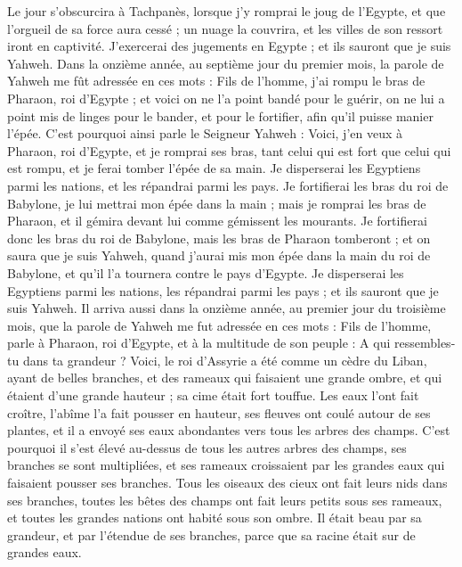 \begin{multicols}{2}
Le jour s’obscurcira à Tachpanès, lorsque j'y romprai le joug de l'Egypte, et que l'orgueil de sa force aura cessé ; un nuage la couvrira, et les villes de son ressort iront en captivité.
J'exercerai des jugements en Egypte ; et ils sauront que je suis Yahweh.
Dans la onzième année, au septième jour du premier mois, la parole de Yahweh me fût adressée en ces mots :
Fils de l’homme, j'ai rompu le bras de Pharaon, roi d'Egypte ; et voici on ne l'a point bandé pour le guérir, on ne lui a point mis de linges pour le bander, et pour le fortifier, afin qu'il puisse manier l'épée.
C'est pourquoi ainsi parle le Seigneur Yahweh : Voici, j'en veux à Pharaon, roi d'Egypte, et je romprai ses bras, tant celui qui est fort que celui qui est rompu, et je ferai tomber l'épée de sa main.
Je disperserai les Egyptiens parmi les nations, et les répandrai parmi les pays.
Je fortifierai les bras du roi de Babylone, je lui mettrai mon épée dans la main ; mais je romprai les bras de Pharaon, et il gémira devant lui comme gémissent les mourants.
Je fortifierai donc les bras du roi de Babylone, mais les bras de Pharaon tomberont ; et on saura que je suis Yahweh, quand j'aurai mis mon épée dans la main du roi de Babylone, et qu'il l’a tournera contre le pays d'Egypte.
Je disperserai les Egyptiens parmi les nations, les répandrai parmi les pays ; et ils sauront que je suis Yahweh.
\VerseOne{}Il arriva aussi dans la onzième année, au premier jour du troisième mois, que la parole de Yahweh me fut adressée en ces mots :
Fils de l’homme, parle à Pharaon, roi d'Egypte, et à la multitude de son peuple : A qui ressembles-tu dans ta grandeur ?
Voici, le roi d'Assyrie a été comme un cèdre du Liban, ayant de belles branches, et des rameaux qui faisaient une grande ombre, et qui étaient d'une grande hauteur ; sa cime était fort touffue.
Les eaux l'ont fait croître, l'abîme l'a fait pousser en hauteur, ses fleuves ont coulé autour de ses plantes, et il a envoyé ses eaux abondantes vers tous les arbres des champs.
C'est pourquoi il s’est élevé au-dessus de tous les autres arbres des champs, ses branches se sont multipliées, et ses rameaux croissaient par les grandes eaux qui faisaient pousser ses branches.
Tous les oiseaux des cieux ont fait leurs nids dans ses branches, toutes les bêtes des champs ont fait leurs petits sous ses rameaux, et toutes les grandes nations ont habité sous son ombre.
Il était beau par sa grandeur, et par l'étendue de ses branches, parce que sa racine était sur de grandes eaux.

\end{multicols}
